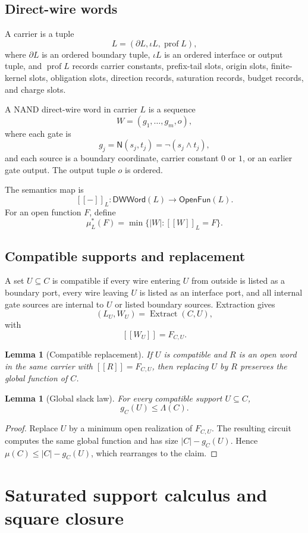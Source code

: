 \documentclass[10.5pt,a4paper]{article}
\newtheorem{lemma}[theorem]{Lemma}
\newcommand{\NAND}{\mathsf{N}}
\newcommand{\DWWord}{\mathsf{DWWord}}
\newcommand{\OpenFun}{\mathsf{OpenFun}}
\newcommand{\Extract}{\operatorname{Extract}}
\begin{document}
\subsection{Direct-wire words}
A carrier is a tuple
\[
L=(\partial L,\iota L,\operatorname{prof}L),
\]
where \(\partial L\) is an ordered boundary tuple, \(\iota L\) is an ordered interface or output tuple, and \(\operatorname{prof}L\) records carrier constants, prefix-tail slots, origin slots, finite-kernel slots, obligation slots, direction records, saturation records, budget records, and charge slots.

A NAND direct-wire word in carrier \(L\) is a sequence
\[
W=(g_1,\ldots,g_m,o),
\]
where each gate is
\[
g_j=\NAND(s_j,t_j)=\neg(s_j\wedge t_j),
\]
and each source is a boundary coordinate, carrier constant \(0\) or \(1\), or an earlier gate output. The output tuple \(o\) is ordered.

The semantics map is
\[
[[{-}]]_L:\DWWord(L)\to\OpenFun(L).
\]
For an open function \(F\), define
\[
\mu_L^*(F)=\min\{|W|:[[W]]_L=F\}.
\]

\subsection{Compatible supports and replacement}
A set \(U\subseteq C\) is compatible if every wire entering \(U\) from outside is listed as a boundary port, every wire leaving \(U\) is listed as an interface port, and all internal gate sources are internal to \(U\) or listed boundary sources. Extraction gives
\[
(L_U,W_U)=\Extract(C,U),
\]
with
\[
[[W_U]]=F_{C,U}.
\]

\begin{lemma}[Compatible replacement]
If \(U\) is compatible and \(R\) is an open word in the same carrier with \([[R]]=F_{C,U}\), then replacing \(U\) by \(R\) preserves the global function of \(C\).
\end{lemma}

\begin{lemma}[Global slack law]
For every compatible support \(U\subseteq C\),
\[
g_C(U)\le\Lambda(C).
\]
\end{lemma}
\begin{proof}
Replace \(U\) by a minimum open realization of \(F_{C,U}\). The resulting circuit computes the same global function and has size \(|C|-g_C(U)\). Hence \(\mu(C)\le |C|-g_C(U)\), which rearranges to the claim.
\end{proof}

\section{Saturated support calculus and square closure}
\end{document}
